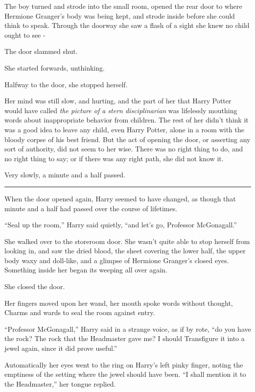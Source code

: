 The boy turned and strode into the small room, opened the rear door to
where Hermione Granger's body was being kept, and strode inside before
she could think to speak. Through the doorway she saw a flash of a sight
she knew no child ought to see -

The door slammed shut.

She started forwards, unthinking.

Halfway to the door, she stopped herself.

Her mind was still slow, and hurting, and the part of her that Harry
Potter would have called \emph{the picture of a stern disciplinarian}
was lifelessly mouthing words about inappropriate behavior from
children. The rest of her didn't think it was a good idea to leave any
child, even Harry Potter, alone in a room with the bloody corpse of his
best friend. But the act of opening the door, or asserting any sort of
authority, did not seem to her wise. There was no right thing to do, and
no right thing to say; or if there was any right path, she did not know
it.

Very slowly, a minute and a half passed.

\begin{center}\rule{3in}{0.4pt}\end{center}

When the door opened again, Harry seemed to have changed, as though that
minute and a half had passed over the course of lifetimes.

``Seal up the room,'' Harry said quietly, ``and let's go, Professor
McGonagall.''

She walked over to the storeroom door. She wasn't quite able to stop
herself from looking in, and saw the dried blood, the sheet covering the
lower half, the upper body waxy and doll-like, and a glimpse of Hermione
Granger's closed eyes. Something inside her began its weeping all over
again.

She closed the door.

Her fingers moved upon her wand, her mouth spoke words without thought,
Charms and wards to seal the room against entry.

``Professor McGonagall,'' Harry said in a strange voice, as if by rote,
``do you have the rock? The rock that the Headmaster gave me? I should
Transfigure it into a jewel again, since it did prove useful.''

Automatically her eyes went to the ring on Harry's left pinky finger,
noting the emptiness of the setting where the jewel should have been.
``I shall mention it to the Headmaster,'' her tongue replied.

